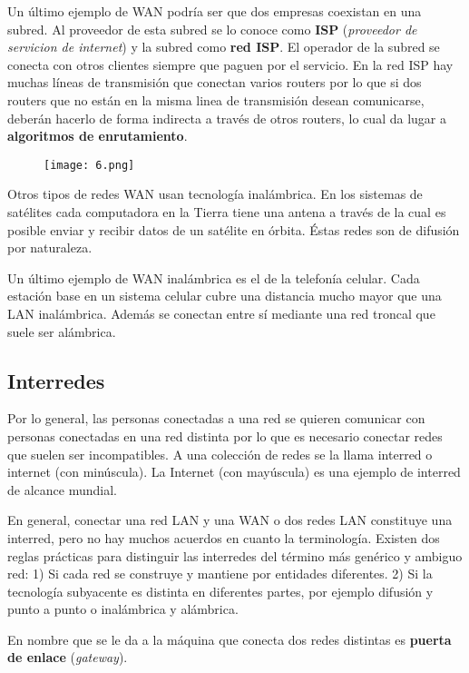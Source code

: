 \documentclass{book}
\begin{document}
	Un último ejemplo de WAN podría ser que dos empresas coexistan en una subred. Al proveedor de esta subred se lo conoce como \textbf{ISP} (\textit{proveedor de servicion de internet}) y la subred como \textbf{red ISP}. El operador de la subred se conecta con otros clientes siempre que paguen por el servicio. En la red ISP hay muchas líneas de transmisión que conectan varios routers por lo que si dos routers que no están en la misma linea de transmisión desean comunicarse, deberán hacerlo de forma indirecta a través de otros routers, lo cual da lugar a \textbf{algoritmos de enrutamiento}.
	
	\begin{figure}[H]
		\centering
		\texttt{[image: 6.png]}
	\end{figure}
	
	Otros tipos de redes WAN usan tecnología inalámbrica. En los sistemas de satélites cada computadora en la Tierra tiene una antena a través de la cual es posible enviar y recibir datos de un satélite en órbita. Éstas redes son de difusión por naturaleza.
	
	Un último ejemplo de WAN inalámbrica es el de la telefonía celular. Cada estación base en un sistema celular cubre una distancia mucho mayor que una LAN inalámbrica. Además se conectan entre sí mediante una red troncal que suele ser alámbrica.
	
	\pagebreak
	\subsection{Interredes}
	Por lo general, las personas conectadas a una red se quieren comunicar con personas conectadas en una red distinta por lo que es necesario conectar redes que suelen ser incompatibles. A una colección de redes se la llama interred o internet (con minúscula). La Internet (con mayúscula) es una ejemplo de interred de alcance mundial.
	
	En general, conectar una red LAN y una WAN o dos redes LAN constituye una interred, pero no hay muchos acuerdos en cuanto la terminología. Existen dos reglas prácticas para distinguir las interredes del término más genérico y ambiguo red: 1) Si cada red se construye y mantiene por entidades diferentes. 2) Si la tecnología subyacente es distinta en diferentes partes, por ejemplo difusión y punto a punto o inalámbrica y alámbrica.
	
	En nombre que se le da a la máquina que conecta dos redes distintas es \textbf{puerta de enlace} (\textit{gateway}).
	
\end{document}
